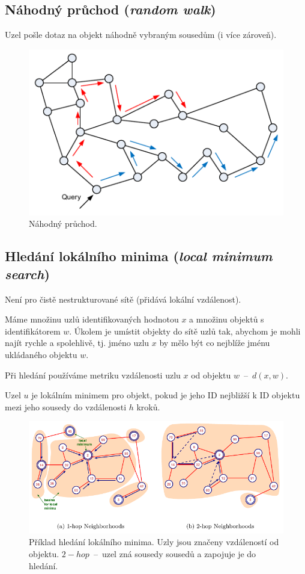 \subsection{Náhodný průchod (\textit{random walk})} \begin{compactitem}
    \item Uzel pošle dotaz na objekt náhodně vybraným sousedům (i více zároveň).
\end{compactitem}

\begin{figure}[H]
    \centering
    \includegraphics[width=0.6\linewidth]{random_walk.pdf}
    \caption{Náhodný průchod.}
\end{figure}

\subsection{Hledání lokálního minima (\textit{local minimum search})} \begin{compactitem}
    \item Není pro čistě nestrukturované sítě (přidává lokální vzdálenost).
    \item Máme množinu uzlů identifikovaných hodnotou $x$ a množinu objektů s identifikátorem $w$. Úkolem je umístit objekty do sítě uzlů tak, abychom je mohli najít rychle a spolehlivě, tj. jméno uzlu $x$ by mělo být co nejblíže jménu ukládaného objektu $w$.
    \item Při hledání používáme metriku vzdálenosti uzlu $x$ od objektu $w$~--~$d(x, w)$.
    \item Uzel $u$ je lokálním minimem pro objekt, pokud je jeho ID nejbližší k ID objektu mezi jeho sousedy do vzdálenosti $h$ kroků.
\end{compactitem}

\begin{figure}[H]
    \centering
    \includegraphics[width=1\linewidth]{lms.pdf}
    \caption{Příklad hledání lokálního minima. Uzly jsou značeny vzdáleností od objektu. $2-hop$~--~uzel zná sousedy sousedů a zapojuje je do hledání.}
\end{figure}

